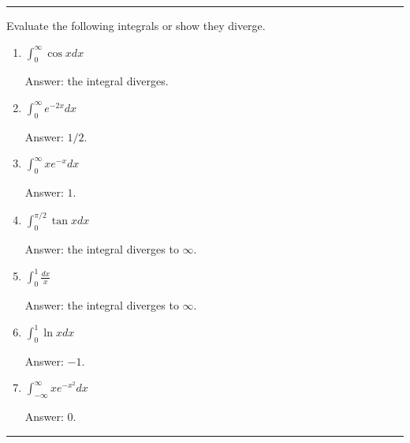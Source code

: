 \documentclass[calc1-main.tex]{subfiles}
\begin{document}
\rule{\textwidth}{1pt}
\begin{multicols}{2}
\begin{exercise}
Evaluate the following integrals or show they diverge.
	\begin{enumerate}
		\item $\displaystyle \int_0^{\infty} \cos x dx$

		Answer: the integral diverges.
		\item $\displaystyle \int_0^{\infty} e^{-2x} dx$

		Answer: $1/2$.
		\item $\displaystyle \int_0^{\infty} x e^{-x} dx$

		Answer: $1$.
		\item $\displaystyle \int_0^{\pi/2} \tan x dx$

		Answer: the integral diverges to $\infty$.
		\item $\displaystyle \int_0^1 \frac{dx}{x}$

		Answer: the integral diverges to $\infty$.
		\item $\displaystyle \int_0^1 \ln x dx$

		Answer: $-1$.

		\item $\displaystyle \int_{-\infty}^{\infty} x e^{-x^2} dx$

		Answer: $0$.
	\end{enumerate}
\end{exercise}
\end{multicols}
\rule{\textwidth}{1pt}
\end{document}
